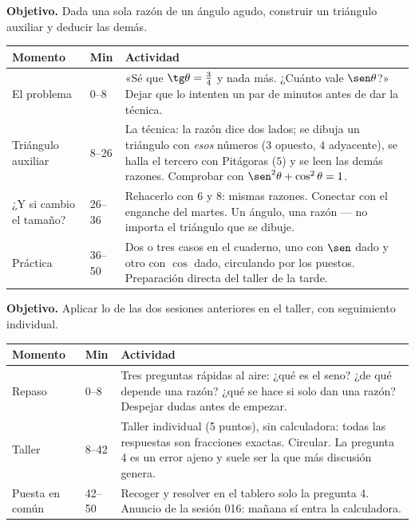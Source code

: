 \documentclass[11pt]{article}
\begin{document}

\textbf{Objetivo.} Dada una sola razón de un ángulo agudo, construir un triángulo auxiliar y
deducir las demás.

\begin{center}
{\renewcommand{\arraystretch}{1.3}
\begin{tabularx}{\linewidth}{@{}l l X@{}}
  \toprule
  \textbf{Momento} & \textbf{Min} & \textbf{Actividad}\\
  \midrule
  El problema & 0--8 & «Sé que $\tg \theta = \frac{3}{4}$ y nada más. ¿Cuánto vale
    $\sen \theta$?» Dejar que lo intenten un par de minutos antes de dar la técnica.\\
  Triángulo auxiliar & 8--26 & La técnica: la razón dice dos lados; se dibuja un triángulo
    con \emph{esos} números ($3$ opuesto, $4$ adyacente), se halla el tercero con Pitágoras
    ($5$) y se leen las demás razones. Comprobar con
    $\sen^2\theta + \cos^2\theta = 1$.\\
  ¿Y si cambio el tamaño? & 26--36 & Rehacerlo con $6$ y $8$: mismas razones. Conectar con
    el enganche del martes. Un ángulo, una razón — no importa el triángulo que se dibuje.\\
  Práctica & 36--50 & Dos o tres casos en el cuaderno, uno con $\sen$ dado y otro con
    $\cos$ dado, circulando por los puestos. Preparación directa del taller de la tarde.\\
  \bottomrule
\end{tabularx}}
\end{center}


\textbf{Objetivo.} Aplicar lo de las dos sesiones anteriores en el taller, con seguimiento
individual.

\begin{center}
{\renewcommand{\arraystretch}{1.3}
\begin{tabularx}{\linewidth}{@{}l l X@{}}
  \toprule
  \textbf{Momento} & \textbf{Min} & \textbf{Actividad}\\
  \midrule
  Repaso & 0--8 & Tres preguntas rápidas al aire: ¿qué es el seno? ¿de qué depende una
    razón? ¿qué se hace si solo dan una razón? Despejar dudas antes de empezar.\\
  Taller & 8--42 & Taller individual (5 puntos), sin calculadora: todas las respuestas son
    fracciones exactas. Circular. La pregunta 4 es un error ajeno y suele ser la que más
    discusión genera.\\
  Puesta en común & 42--50 & Recoger y resolver en el tablero solo la pregunta 4. Anuncio
    de la sesión 016: mañana sí entra la calculadora.\\
  \bottomrule
\end{tabularx}}
\end{center}
\end{document}
